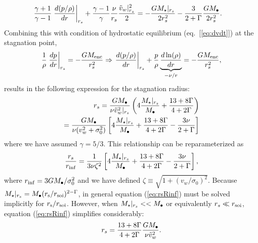 \begin{align}
&\frac{\gamma+1}{\gamma-1}
\left.\frac{d (p/\rho)}{d r}\right|_{r_s}+ \frac{\gamma-1}{\gamma} \frac{\nu}{r_s} \frac{\tilde{v}_{w}|_{r_s}^{2}}{2} = -\frac{G
  M_{\star}|_{r_s}}{2 r_s^2} -\frac{3}{2+\Gamma} \frac{G M_{\bullet}}{2 r_s^2}.  \label{eq:rs1}
\end{align}
Combining this with condition of hydrostatic equilibrium (eq.~[\ref{eq:dvdt}]) at the stagnation point,
\begin{align}
\frac{1}{\rho}\left.\frac{d p}{d r}\right|_{r_s}=- \frac{GM_{\rm enc}}{r_s^2} \Rightarrow
\left.\frac{d (p/\rho)}{d r}\right|_{r_s} +\frac{p}{\rho}
\underbrace{\frac{d\ln(\rho)}{dr}}_{-\nu/r} = -\frac{G M_{\rm enc}}{r_s^2}, \label{eq:HSE}
\end{align}
results in the following expression for the stagnation radius:
\begin{align}
r_s=\frac{G M_{\bullet}}{\nu \tilde{v}_{w}^{2}|_{r_s}}\left(4
  \frac{M_{\star}|_{r_s}}{M_{\bullet}} +\frac{13+ 8\Gamma}{4+2\Gamma}\right) \nonumber \\
=\frac{G M_{\bullet}}{\nu (v_w^{2}+\sigma_0^2)}\left[4
    \frac{M_{\star}|_{r_s}}{M_{\bullet}} +\frac{13+ 8\Gamma}{4+2\Gamma}-\frac{3\nu }{2+\Gamma}\right]
\label{eq:rs2main}
\end{align}
where we have assumed $\gamma=5/3$.  This relationship can be reparameterized as
\begin{align}
  \frac{r_s}{r_{\rm inf}}=\frac{1}{3\nu \zeta^2} \left[4\frac{M_{\star}|_{r_s}}{M_{\bullet}} +\frac{13+8\Gamma}{4+2\Gamma}- \frac{3\nu }{2+\Gamma}\right],
  \label{eq:rsRinf}
\end{align}
where $r_{\rm inf}=3 G M_{\bullet}/\sigma_0^2$ and we have defined $\zeta \equiv \sqrt{1 + (v_w/\sigma_0)^2}$.  Because $M_{\star}|_{r_s} = M_{\bullet}(r_{\rm s}/r_{\rm soi})^{2-\Gamma}$, in general equation (\ref{eq:rsRinf}) must be solved implicitly for $r_{\rm s}/r_{\rm soi}$.  However, when $M_{\star}|_{r_s} << M_{\bullet}$ or equivalently $r_s \ll r_{\rm soi}$, equation (\ref{eq:rsRinf}) simplifies considerably:
\begin{align}
r_s=\frac{13+8\Gamma}{4+2\Gamma} \frac{G M_{\bullet}}{\nu \tilde{v}_{w}^2}.
\end{align}

